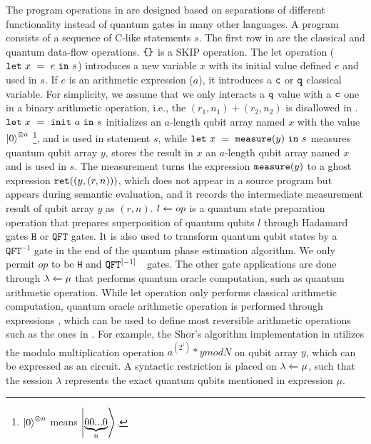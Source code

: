 The \qafny program operations in  are designed based on separations of different functionality instead of quantum gates in many other languages. A program consists of a sequence of C-like statements $s$.
The first row in  are the classical and quantum data-flow operations.
$\sskip$ is a SKIP operation. The let operation ($\sexp{x}{e}{s}$) introduces a new variable $x$ with its initial value defined $e$ and used in $s$. If $e$ is an arithmetic expression ($a$), it introduces a $\cmode$ or $\qmode$ classical variable. For simplicity, we assume that we only interacts a $\qmode$ value with a $\cmode$ one in a binary arithmetic operation, i.e., the $(r_1,n_1)+(r_2,n_2)$ is disallowed in \qafny. $\sexp{x}{\sinit{a}}{s}$ initializes an $a$-length qubit array named $x$ with the value $\ket{0}^{\otimes a}$ \footnote{$\ket{0}^{\otimes n}$ means $\ket{\underbrace{00...0}_\text{n}}$.}, and is used in statement $s$, while
$\sexp{x}{\smea{y}}{s}$ measures quantum qubit array $y$, stores the result in $x$ an $a$-length qubit array named $x$ and is used in $s$.
The measurement turns the expression $\smea{y}$ to a ghost expression $\sret{(y,(r,n))}$, which does not appear in a \qafny source program but appears during semantic evaluation, and it records the intermediate measurement result of qubit array $y$ as $(r,n)$.
$\ssassign{l}{}{op}$ is a quantum state preparation operation that prepares superposition of quantum qubits $l$ through Hadamard gates $\texttt{H}$ or $\texttt{QFT}$ gates. It is also used to transform quantum qubit states by a $\texttt{QFT}^{-1}$ gate in the end of the quantum phase estimation algorithm. 
We only permit $op$ to be \texttt{H} and $\iqft[\lbrack -1 \rbrack]{}{}$ gates.
The other gate applications are done through $\ssassign{\lambda}{}{\mu}$ that performs quantum oracle computation, such as quantum arithmetic operation. While let operation only performs classical arithmetic computation, quantum oracle arithmetic operation is performed through \oqasm expressions \cite{oracleoopsla}, which can be used to define most reversible arithmetic operations such as the ones in . 
For example, the Shor's algorithm implementation in  utilizes the modulo multiplication operation $a^(2^i) * y mod N$ on qubit array $y$, which can be expressed as an \oqasm circuit.
A syntactic restriction is placed on $\ssassign{\lambda}{}{\mu}$, such that the session $\lambda$ represents the exact quantum qubits mentioned in expression $\mu$. 

